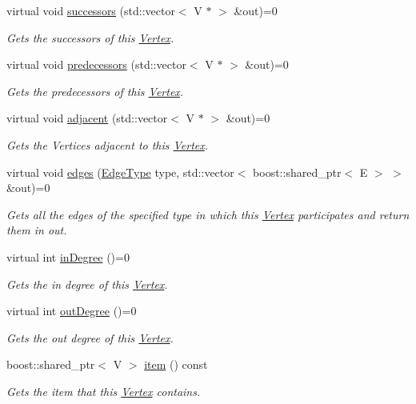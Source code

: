 \begin{DoxyCompactItemize}
virtual void \hyperlink{classrepast_1_1_vertex_a0e3a2812db0b42ca344bd577076002d0}{successors} (std\-::vector$<$ V $\ast$ $>$ \&out)=0
\begin{DoxyCompactList}\small\item\em Gets the successors of this \hyperlink{classrepast_1_1_vertex}{Vertex}. \end{DoxyCompactList}\item 
virtual void \hyperlink{classrepast_1_1_vertex_ad27c48d86502b4e73aba445de07c084c}{predecessors} (std\-::vector$<$ V $\ast$ $>$ \&out)=0
\begin{DoxyCompactList}\small\item\em Gets the predecessors of this \hyperlink{classrepast_1_1_vertex}{Vertex}. \end{DoxyCompactList}\item 
virtual void \hyperlink{classrepast_1_1_vertex_ac0952ef9c988dc4792900ded7d033667}{adjacent} (std\-::vector$<$ V $\ast$ $>$ \&out)=0
\begin{DoxyCompactList}\small\item\em Gets the Vertices adjacent to this \hyperlink{classrepast_1_1_vertex}{Vertex}. \end{DoxyCompactList}\item 
virtual void \hyperlink{classrepast_1_1_vertex_af652dbbcd2b328685cdd2bb34a7d9240}{edges} (\hyperlink{classrepast_1_1_vertex_a8b4819d648c7c0dd8b0622beea77cc14}{Edge\-Type} type, std\-::vector$<$ boost\-::shared\-\_\-ptr$<$ E $>$ $>$ \&out)=0
\begin{DoxyCompactList}\small\item\em Gets all the edges of the specified type in which this \hyperlink{classrepast_1_1_vertex}{Vertex} participates and return them in out. \end{DoxyCompactList}\item 
virtual int \hyperlink{classrepast_1_1_vertex_a14a787ee4d9ad1069c483b454b8a0004}{in\-Degree} ()=0
\begin{DoxyCompactList}\small\item\em Gets the in degree of this \hyperlink{classrepast_1_1_vertex}{Vertex}. \end{DoxyCompactList}\item 
virtual int \hyperlink{classrepast_1_1_vertex_a47e058f671914d7c65553bbe20138f33}{out\-Degree} ()=0
\begin{DoxyCompactList}\small\item\em Gets the out degree of this \hyperlink{classrepast_1_1_vertex}{Vertex}. \end{DoxyCompactList}\item 
boost\-::shared\-\_\-ptr$<$ V $>$ \hyperlink{classrepast_1_1_vertex_a55749dbe0d9f79bb39dfea7733070305}{item} () const 
\begin{DoxyCompactList}\small\item\em Gets the item that this \hyperlink{classrepast_1_1_vertex}{Vertex} contains. \end{DoxyCompactList}\end{DoxyCompactItemize}
